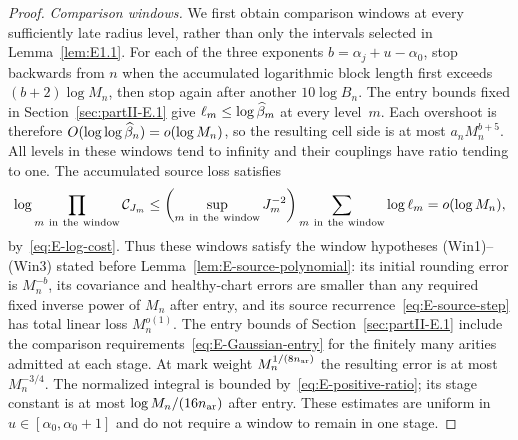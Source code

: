 \begin{proof}
\emph{Comparison windows.} We first obtain comparison windows at every sufficiently late radius level, rather than only the intervals selected in Lemma~\ref{lem:E1.1}. For each of the three exponents $b=\alpha_j+u-\alpha_0$, stop backwards from $n$ when the accumulated logarithmic block length first exceeds $(b+2)\log M_n$, then stop again after another $10\log B_n$. The entry bounds fixed in Section~\ref{sec:partII-E.1} give $\ell_m\le\log\widehat{\beta}_m$ at every level~$m$. Each overshoot is therefore $O(\log\log\widehat{\beta}_n)=o(\log M_n)$, so the resulting cell side is at most $a_nM_n^{b+5}$. All levels in these windows tend to infinity and their couplings have ratio tending to one. The accumulated source loss satisfies
\begin{equation*}
 \log\prod_{m\ {\rm in\ the\ window}}\mathcal C_{J_m}
 \le\left(\sup_{m\ {\rm in\ the\ window}}J_m^{-2}\right)
       \sum_{m\ {\rm in\ the\ window}}\log\ell_m
 =o(\log M_n),
\end{equation*}
by~\eqref{eq:E-log-cost}. Thus these windows satisfy the window hypotheses (Win1)--(Win3) stated before Lemma~\ref{lem:E-source-polynomial}: its initial rounding error is $M_n^{-b}$, its covariance and healthy-chart errors are smaller than any required fixed inverse power of $M_n$ after entry, and its source recurrence~\eqref{eq:E-source-step} has total linear loss $M_n^{o(1)}$. The entry bounds of Section~\ref{sec:partII-E.1} include the comparison requirements~\eqref{eq:E-Gaussian-entry} for the finitely many arities admitted at each stage. At mark weight $M_n^{1/(8n_{\rm ar})}$ the resulting error is at most $M_n^{-3/4}$. The normalized integral is bounded by~\eqref{eq:E-positive-ratio}; its stage constant is at most $\log M_n/(16n_{\rm ar})$ after entry. These estimates are uniform in $u\in[\alpha_0,\alpha_0+1]$ and do not require a window to remain in one stage.


\end{proof}
